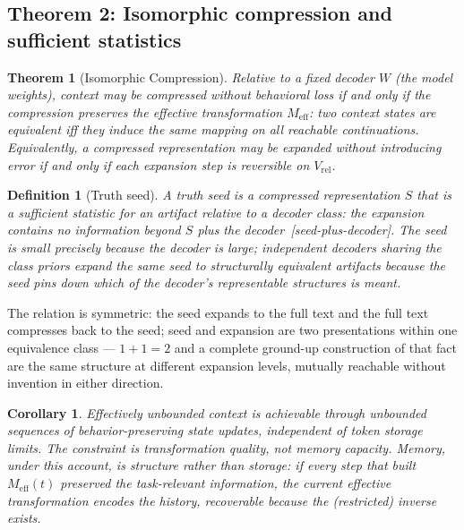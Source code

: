 \documentclass[11pt]{article}
\newtheorem{theorem}{Theorem}
\newtheorem{corollary}{Corollary}
\newtheorem{definition}{Definition}
\theoremstyle{remark}
\newif\ifslugs \slugstrue  %
\newcommand{\slug}[1]{\ifslugs\,{\small\textit{[#1]}}\fi}
\newcommand{\Vrel}{V_{\mathrm{rel}}}
\newcommand{\Meff}{M_{\mathrm{eff}}}
\begin{document}
\subsection{Theorem 2: Isomorphic compression and sufficient statistics}

\begin{theorem}[Isomorphic Compression]
\label{thm:compression}
Relative to a fixed decoder $W$ (the model weights), context may be compressed without
behavioral loss if and only if the compression preserves the effective transformation $\Meff$:
two context states are equivalent iff they induce the same mapping on all reachable
continuations. Equivalently, a compressed representation may be expanded without
introducing error if and only if each expansion step is reversible on $\Vrel$.
\end{theorem}

\begin{definition}[Truth seed]
A \emph{truth seed} is a compressed representation $S$ that is a sufficient statistic
for an artifact relative to a decoder class: the expansion contains no information
beyond $S$ \emph{plus the decoder} \citep{kolmogorov1965}\slug{seed-plus-decoder}. The seed is small precisely
because the decoder is large; independent decoders sharing the class priors expand the
same seed to structurally equivalent artifacts because the seed pins down which of the
decoder's representable structures is meant.
\end{definition}

The relation is symmetric: the seed expands to the full text and the full text
compresses back to the seed; seed and expansion are two presentations within one
equivalence class --- $1+1=2$ and a complete ground-up construction of that fact are
the same structure at different expansion levels, mutually reachable without invention
in either direction.

\begin{corollary}
Effectively unbounded context is achievable through unbounded sequences of
behavior-preserving state updates, independent of token storage limits. The constraint
is transformation quality, not memory capacity. Memory, under this account, is
\emph{structure} rather than storage: if every step that built $\Meff(t)$ preserved
the task-relevant information, the current effective transformation encodes the
history, recoverable because the (restricted) inverse exists.
\end{corollary}
\end{document}
